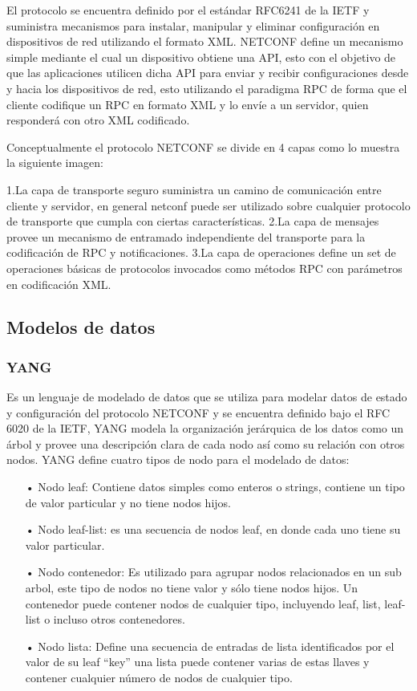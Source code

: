 El protocolo se encuentra definido por el estándar RFC6241 de la IETF y suministra mecanismos para instalar, manipular y eliminar configuración en dispositivos de red utilizando el formato XML.
NETCONF define un mecanismo simple mediante el cual un dispositivo obtiene una API, esto con el objetivo de que las aplicaciones utilicen dicha API para enviar y recibir configuraciones desde y hacia los dispositivos de red, esto utilizando el paradigma RPC de forma que el cliente codifique un RPC en formato XML y lo envíe a un servidor, quien responderá con otro XML codificado.

Conceptualmente el protocolo NETCONF se divide en 4 capas como lo muestra la siguiente imagen:


1.La capa de transporte seguro suministra un camino de comunicación entre cliente y servidor, en general netconf puede ser utilizado sobre cualquier protocolo de transporte que cumpla con ciertas características.
2.La capa de mensajes provee un mecanismo de entramado independiente del transporte para la codificación de RPC y notificaciones.
3.La capa de operaciones define un set de operaciones básicas de protocolos invocados como métodos RPC con parámetros en codificación XML.

\subsection{Modelos de datos}
\label{sec:Modelos de datos}

\subsubsection{YANG}
\label{sec:YANG}


Es un lenguaje de modelado de datos que se utiliza para modelar datos de estado y configuración del protocolo NETCONF y se encuentra definido bajo el RFC 6020 de la IETF, YANG modela la organización jerárquica de los datos como un árbol y provee una descripción clara de cada nodo así como su relación con otros nodos.
YANG define cuatro tipos de nodo para el modelado de datos:

\begin{itemize}
\item[•] Nodo leaf: Contiene datos simples como enteros o strings, contiene un tipo de valor particular y no tiene nodos hijos.
\item[•]Nodo leaf-list: es una secuencia de nodos leaf, en donde cada uno tiene su valor particular.
\item[•]Nodo contenedor: Es utilizado para agrupar nodos relacionados en un sub arbol, este tipo de nodos no tiene valor y sólo tiene nodos hijos. Un contenedor puede contener nodos de cualquier tipo, incluyendo leaf, list, leaf-list o incluso otros contenedores.
\item[•]Nodo lista: Define una secuencia de entradas de lista identificados por el valor de su leaf “key” una lista puede contener varias de estas llaves y contener cualquier número de nodos de cualquier tipo.

\end{itemize}

